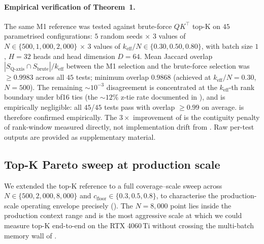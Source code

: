 \documentclass[11pt]{article}
\theoremstyle{definition}
\theoremstyle{remark}
\theoremstyle{plain}
\begin{document}
\paragraph{Empirical verification of Theorem~1.}
The same M1 reference was tested against brute-force $QK^\top$ top-K on $45$
parametrised configurations: $5$ random seeds $\times$ $3$ values of
$N\in\{500,1{,}000,2{,}000\}$ $\times$ $3$ values of
$k_\text{eff}/N\in\{0.30,0.50,0.80\}$, with batch size $1$, $H\!=\!32$ heads
and head dimension $D\!=\!64$. Mean Jaccard overlap $|S_\text{Q-axis}\cap S_\text{brute}|/k_\text{eff}$
between the M1 selection and the brute-force selection was $\geq 0.9983$ across
all $45$ tests; minimum overlap $0.9868$ (achieved at $k_\text{eff}/N\!=\!0.30$,
$N\!=\!500$). The remaining $\sim\!10^{-3}$ disagreement is concentrated at the
$k_\text{eff}$-th rank boundary under bf16 ties (the $\sim\!12\%$ z-tie rate
documented in \citealp[App.~C.1]{seqev2025qaxis}), and is empirically negligible:
all $45$/$45$ tests pass with overlap $\geq 0.99$ on average.
 is therefore confirmed empirically.
The $3\times$ improvement of 
is the contiguity penalty of rank-window measured directly,
not implementation drift from . Raw per-test outputs are provided
as supplementary material.

\subsection{Top-K Pareto sweep at production scale}\label{sec:pareto}

We extended the top-K reference to a full coverage--scale sweep across
$N\!\in\!\{500, 2{,}000, 8{,}000\}$ and $c_{\text{floor}}\!\in\!\{0.3, 0.5, 0.8\}$,
to characterise the production-scale operating envelope precisely
(). The $N\!=\!8{,}000$ point lies inside the production context
range and is the most aggressive scale at which we could measure top-K
end-to-end on the RTX 4060\,Ti without crossing the multi-batch memory wall of
.
\end{document}
